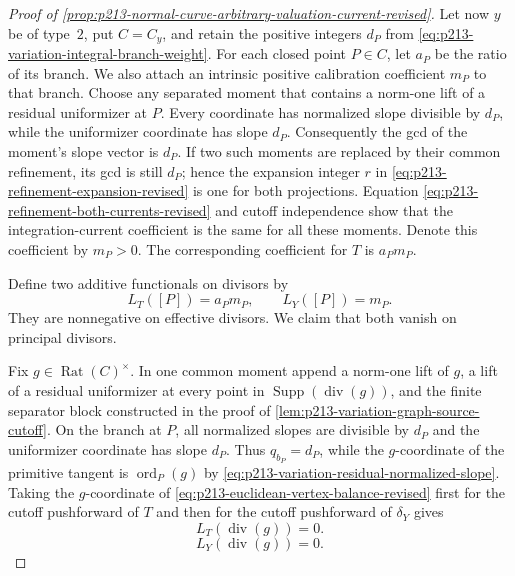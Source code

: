 \begin{proof}[Proof of
\cref{prop:p213-normal-curve-arbitrary-valuation-current-revised}]
Let now $y$ be of type~$2$, put $C=C_y$, and retain the positive integers
$d_P$ from \eqref{eq:p213-variation-integral-branch-weight}.  For each
closed point $P\in C$, let $a_P$ be the ratio of its branch.  We also
attach an intrinsic positive calibration coefficient $m_P$ to that
branch.  Choose any separated moment that contains a norm-one lift of a
residual uniformizer at $P$.  Every coordinate has normalized slope
divisible by $d_P$, while the uniformizer coordinate has slope $d_P$.
Consequently the gcd of the moment's slope vector is $d_P$.  If two such
moments are replaced by their common refinement, its gcd is still $d_P$;
hence the expansion integer $r$ in
\eqref{eq:p213-refinement-expansion-revised} is one for both projections.
Equation \eqref{eq:p213-refinement-both-currents-revised} and cutoff
independence show that the integration-current coefficient is the same for
all these moments.  Denote this coefficient by $m_P>0$.  The corresponding
coefficient for $T$ is $a_Pm_P$.

Define two additive functionals on divisors by
\begin{equation}
       L_T([P])=a_Pm_P,
       \qquad
       L_Y([P])=m_P.
\label{eq:p213-divisor-functionals-revised}
\end{equation}
They are nonnegative on effective divisors.  We claim that both vanish on
principal divisors.

Fix $g\in\operatorname{Rat}(C)^\times$.  In one common moment append a
norm-one lift of $g$, a lift of a residual uniformizer at every point in
$\operatorname{Supp}(\operatorname{div}(g))$, and the finite separator
block constructed in the proof of
\cref{lem:p213-variation-graph-source-cutoff}.  On the branch at $P$, all
normalized slopes are divisible by $d_P$ and the uniformizer coordinate
has slope $d_P$.  Thus $q_{b_P}=d_P$, while the $g$-coordinate of the
primitive tangent is $\operatorname{ord}_P(g)$ by
\eqref{eq:p213-variation-residual-normalized-slope}.  Taking the
$g$-coordinate of
\eqref{eq:p213-euclidean-vertex-balance-revised} first for the cutoff
pushforward of $T$ and then for the cutoff pushforward of $\delta_Y$ gives
\begin{equation}
                         L_T(\operatorname{div}(g))=0.
\label{eq:p213-T-principal-zero-revised}
\end{equation}
\begin{equation}
                         L_Y(\operatorname{div}(g))=0.
\label{eq:p213-Y-principal-zero-revised}
\end{equation}


\end{proof}
